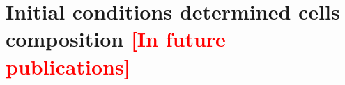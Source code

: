 \documentclass{article}
\begin{document}

\newpage
\section{Initial conditions determined cells composition \label{sec:cellComposition}  \textcolor{red}{[In future publications]}}
\end{document}
